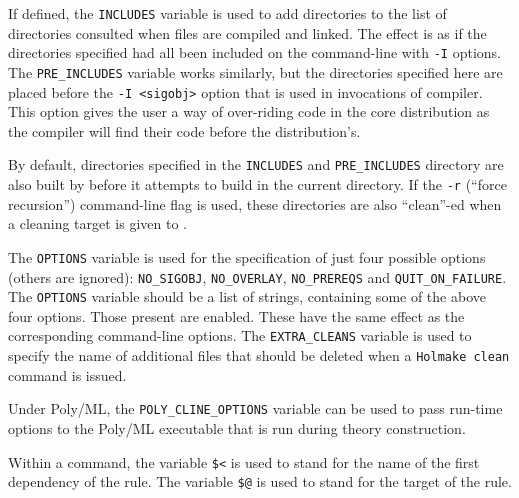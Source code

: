 If defined, the \texttt{INCLUDES} variable is used to add directories to the list of directories consulted when files are compiled and linked.
The effect is as if the directories specified had all been included on the command-line with \texttt{-I} options.
The \texttt{PRE\_INCLUDES} variable works similarly, but the directories specified here are placed before the \mbox{\texttt{-I <sigobj>}} option that is used in invocations of compiler.
This option gives the user a way of over-riding code in the core distribution as the compiler will find their code before the distribution's.

By default, directories specified in the \texttt{INCLUDES} and \texttt{PRE\_INCLUDES} directory are also built by \holmake{} before it attempts to build in the current directory.
If the \texttt{-r} (``force recursion'') command-line flag is used, these directories are also ``clean''-ed when a cleaning target is given to \holmake{}.

The \texttt{OPTIONS} variable is used for the specification of just
four possible options (others are ignored): \texttt{NO\_SIGOBJ},
\texttt{NO\_OVERLAY}, \texttt{NO\_PREREQS} and
\texttt{QUIT\_ON\_FAILURE}.  The \texttt{OPTIONS} variable should be a
list of strings, containing some of the above four options.  Those
present are enabled.  These have the same effect as the corresponding
command-line options. The \texttt{EXTRA\_CLEANS} variable is used to
specify the name of additional files that should be deleted when a
\texttt{Holmake clean} command is issued.

Under Poly/ML, the \texttt{POLY\_CLINE\_OPTIONS} variable can be used to pass run-time options to the Poly/ML executable that is run during theory construction.

Within a command, the variable \texttt{\$<} is used to stand for the
name of the first dependency of the rule.  The variable \texttt{\$@} is
used to stand for the target of the rule.

